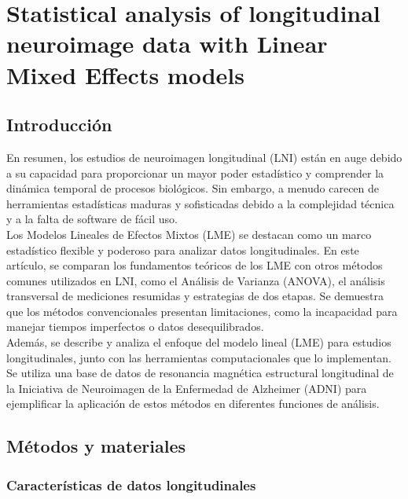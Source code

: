 \documentclass[12pt]{article}
\begin{document}
\section{Statistical analysis of longitudinal neuroimage data with Linear Mixed Effects models}


\subsection{Introducción}
En resumen, los estudios de neuroimagen longitudinal (LNI) están en auge debido a su capacidad para proporcionar un mayor poder estadístico y comprender la dinámica temporal de procesos biológicos. Sin embargo, a menudo carecen de herramientas estadísticas maduras y sofisticadas debido a la complejidad técnica y a la falta de software de fácil uso.\\

Los Modelos Lineales de Efectos Mixtos (LME) se destacan como un marco estadístico flexible y poderoso para analizar datos longitudinales. En este artículo, se comparan los fundamentos teóricos de los LME con otros métodos comunes utilizados en LNI, como el Análisis de Varianza (ANOVA), el análisis transversal de mediciones resumidas y estrategias de dos etapas. Se demuestra que los métodos convencionales presentan limitaciones, como la incapacidad para manejar tiempos imperfectos o datos desequilibrados.\\

Además, se describe y analiza el enfoque del modelo lineal (LME) para estudios longitudinales, junto con las herramientas computacionales que lo implementan. Se utiliza una base de datos de resonancia magnética estructural longitudinal de la Iniciativa de Neuroimagen de la Enfermedad de Alzheimer (ADNI) para ejemplificar la aplicación de estos métodos en diferentes funciones de análisis.

\subsection{Métodos y materiales}
\subsubsection{Características de datos longitudinales}
\end{document}
